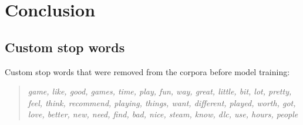 \documentclass[11pt, a4paper]{article}
\newenvironment{itquote}
  {\begin{quote}\itshape}
  {\end{quote}\ignorespacesafterend}
\begin{document}
\section{Conclusion}


\clearpage

\nocite{*}
\printbibliography

\clearpage

\begin{appendices}
\section{Custom stop words}\label{stops}
Custom stop words that were removed from the corpora before model training:
\begin{itquote}
    game, like, good, games, time, play, fun, way, great, little, bit, lot, pretty, feel, think, recommend, playing, things, want, different, played, worth, got, love, better, new, need, find, bad, nice, steam, know, dlc, use, hours, people
\end{itquote}
\end{appendices}
\end{document}
